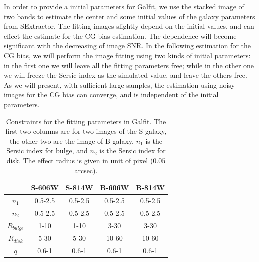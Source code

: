 \documentclass[useAMS,usenatbib]{mn2e}
\begin{document}
In order to provide a initial parameters for Galfit, we use the
stacked image of two bands to estimate the center and some initial
values of the galaxy parameters from SExtractor. The fitting images
slightly depend on the initial values, and can effect the estimate for
the CG bias estimation.  The dependence will become significant with
the decreasing of image SNR.  In the following estimation for the CG
bias, we will perform the image fitting using two kinds of initial
parameters: in the first one we will leave all the fitting parameters
free; while in the other one we will freeze the Sersic index as the
simulated value, and leave the others free. As we will present,
with sufficient large samples, the estimation using noisy images for the
CG bias can converge, and is independent of the initial parameters.

%
\begin{center}
\begin{table}
\begin{tabular}{|c|c|c|c|c|}
\hline\hline
 &S-606W  & S-814W  & B-606W & B-814W \\ \hline
$n_1$ &0.5-2.5  &0.5-2.5  &0.5-2.5 &0.5-2.5 \\ \hline
$n_2$ &0.5-2.5  &0.5-2.5  &0.5-2.5 &0.5-2.5 \\ \hline
$R_{bulge}$ &1-10 &1-10  &3-30  &3-30  \\ \hline
$R_{disk}$  &5-30 &5-30  &10-60 &10-60 \\ \hline
$q$      &0.6-1  &0.6-1  &0.6-1 &0.6-1 \\ \hline
\hline
\end{tabular}
\caption{\label{fitpar} Constraints for the fitting parameters in Galfit.
The first two columns are for two images of the S-galaxy, the other two are
the image of B-galaxy.
$n_1$ is the Sersic index for bulge, and $n_2$ is the Sersic index for disk.
The effect radius is given in unit of pixel ($0.05$ arcsec).}
\end{table}
\end{center}
%
\end{document}
